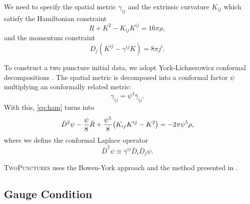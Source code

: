 \documentclass[]{article}
\begin{document}
We need to specify the spatial metric $\gamma_{ij}$ and the extrinsic curvature $K_{ij}$ which satisfy the Hamiltonian constraint
\begin{equation}
	\label{eq:ham}
	R + K^2 - K_{ij}K^{ij} = 16 \pi \rho,
\end{equation}
and the momentum constraint
\begin{equation}
	\label{eq:mom}
	D_j(K^{ij} - \gamma^{ij}K) = 8\pi j^i.
\end{equation}

To construct a two puncture initial data, we adopt York-Lichnerowicz conformal decompositions \cite{PhysRevLett.26.1656, Lichnerowicz:1944zz}. The spatial metric is decomposed into a conformal factor $\psi$ multiplying an conformally related metric:
\begin{equation}
	\label{eq:conformalmetric}
	\gamma_{ij} = \psi^4 \bar{\gamma}_{ij}.
\end{equation}
With this, \eqref{eq:ham} turns into
\begin{equation}
	\label{eq:conham}
	\bar{D}^2\psi - \frac{\psi}{8}\bar{R}+\frac{\psi^5}{8}\qty(K_{ij}K^{ij}-K^2)=-2\pi \psi^5 \rho,
\end{equation}
where we define the conformal Laplace operator
\begin{equation}
	\bar{D}^2\psi \equiv \bar{\gamma}^{ij}\bar{D}_i\bar{D}_j \psi.
\end{equation}

\textsc{TwoPunctures} \cite{Ansorg:2004ds} uses the Bowen-York approach \cite{Bowen:1980yu} and the method presented in \cite{PhysRevD.77.024027}.


\subsection{Gauge Condition}
\end{document}
